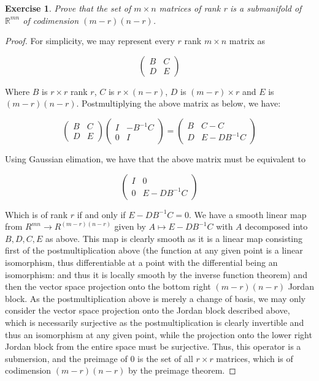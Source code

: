 \message{ !name(Homework3.tex)}\documentclass{article}
\newtheorem{exercise}{Exercise}
\begin{document}
\begin{exercise}
  Prove that the set of $m \times n$ matrices of rank r is a submanifold of $\mathbb{R}^{mn}$ of codimension $(m-r)(n-r)$. 
  \end{exercise}
  \begin{proof}
    For simplicity, we may represent every $r$ rank $m\times n$ matrix as

    \[
      \begin{pmatrix} B & C \\ D & E \end{pmatrix}
    \]

    Where $B$ is $r\times r$ rank $r$, $C$ is $r \times (n -r)$, $D$ is $(m-r) \times r$ and $E$ is $(m-r)(n-r)$. Postmultiplying the above matrix as below, we have:

    \[
      \begin{pmatrix} B & C \\ D & E \end{pmatrix} \begin{pmatrix} I & -B^{-1}C \\ 0 & I \end{pmatrix} =  \begin{pmatrix} B & C - C \\ D & E - DB^{-1}C \end{pmatrix}
    \]

    Using Gaussian elimation, we have that the above matrix must be equivalent to

    \[
 \begin{pmatrix} I & 0 \\ 0 & E - DB^{-1}C \end{pmatrix}
\]

Which is of rank $r$ if and only if $E - DB^{-1}C = 0$. We have a smooth linear map from $R^{mn} \to R^{(m-r)(n-r)}$ given by $A \mapsto E - DB^{-1}C$ with $A$ decomposed into $B, D, C, E$ as above. This map is clearly smooth as it is a linear map consisting first of the postmultiplication above (the function at any given point is a linear isomorphism, thus differentiable at a point with the differential being an isomorphism: and thus it is locally smooth by the inverse function theorem) and then the vector space projection onto the bottom right $(m-r)(n-r)$ Jordan block. As the postmultiplication above is merely a change of basis, we may only consider the vector space projection onto the Jordan block described above, which is necessarily surjective as the postmultiplication is clearly invertible and thus an isomorphism at any given point, while the projection onto the lower right Jordan block from the entire space must be surjective. Thus, this operator is a submersion, and the preimage of $0$ is the set of all $r \times r$ matrices, which is of codimension $(m-r)(n-r)$ by the preimage theorem. 
    \end{proof}
\end{document}
